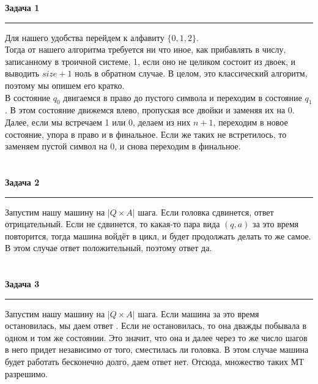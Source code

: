 \documentclass[a4paper,11pt]{article}
\begin{document}
\textbf{\large Задача 1}
\medskip\hrule\medskip
Для нашего удобства перейдем к алфавиту $ \{0, 1, 2\} $. \\[2pt]
Тогда от нашего алгоритма требуется ни что иное, как прибавлять в числу, записанному в троичной системе, 1, если оно не целиком состоит из двоек, и выводить $ size + 1 $ ноль в обратном случае. В целом, это классический алгоритм, поэтому мы опишем его кратко.  \\[3pt]
В состояние $ q_0 $ двигаемся в право до пустого символа и переходим в состояние $ q_1 $. В этом состояние движемся влево, пропуская все двойки и заменяя их на 0. Далее, если мы встречаем 1 или 0, делаем из них $ n + 1 $, переходим в новое состояние, упора в право и в финальное. Если же таких не встретилось, то заменяем пустой символ на 0, и снова переходим в финальное.
\\ \\ \\





\textbf{\large Задача 2}
\medskip\hrule\medskip
Запустим нашу машину на $ |Q \times A| $ шага. Если головка сдвинется, ответ отрицательный. Если не сдвинется, то какая-то пара вида $ (q,a) $ за это время повторится, тогда машина войдёт в цикл, и будет продолжать делать то же самое. В этом случае ответ положительный, поэтому ответ да.
\\ \\ \\





\textbf{\large Задача 3}
\medskip\hrule\medskip
Запустим нашу машину на $ |Q \times A| $ шага. Если  машина за это время остановилась,  мы даем ответ . Если не остановилась, то она дважды побывала в одном и том же состоянии. Это значит, что она и далее через то же число шагов в него придет независимо от того, сместилась ли головка. В этом случае машина будет работать бесконечно долго, даем ответ нет. Отсюда, множество таких МТ разрешимо.
\end{document}
